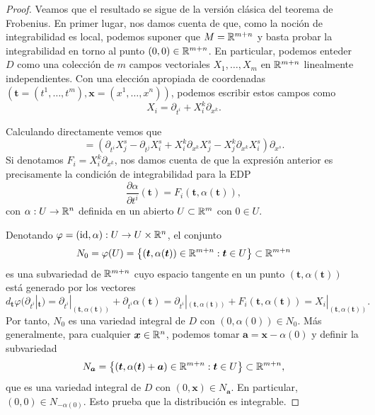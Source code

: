 \documentclass[11pt,a4paper]{amsbook}
\theoremstyle{remark} \newtheorem{rmk}[subsection]{Observación}
\theoremstyle{definition} \newtheorem{defn}[subsection]{Definición}
\theoremstyle{definition} \newtheorem{ex}[subsection]{Ejemplo}
\theoremstyle{definition} \newtheorem{ej}[subsection]{Ejercicio}
\begin{document}
\begin{proof}
  Veamos que el resultado se sigue de la versión clásica del teorema de Frobenius. En primer lugar, nos damos cuenta de que, como la noción de integrabilidad es local, podemos suponer que $M=\mathbb R^{m+n}$ y basta probar la integrabilidad en torno al punto $(0,0)\in \mathbb R^{m+n}$. En particular, podemos enteder $D$ como una colección de $m$ campos vectoriales $X_1,\dots,X_m$ en $\mathbb R^{m+n}$ linealmente independientes. Con una elección apropiada de coordenadas $(\bm{t}=(t^1,\dots,t^m),\bm{x}=(x^1,\dots,x^n))$, podemos escribir estos campos como
  \begin{equation*}
X_i = \partial_{t^i} + X_i^k \partial_{x^k}.
  \end{equation*}

  Calculando directamente vemos que
  \begin{equation*}
[X_i,X_j] = \left( \partial_{t^i} X^s_j - \partial_{t^j} X^s_i + X_i^k \partial_{x^k} X^s_j - X^k_j \partial_{x^k} X^s_i \right) \partial_{x^s}.
  \end{equation*}
  Si denotamos $F_i = X_i^k \partial_{x^k}$, nos damos cuenta de que la expresión anterior es precisamente la condición de integrabilidad para la EDP
  \begin{equation*}
\frac{\partial \alpha}{\partial t^i}(\bm{t}) = F_i(\bm{t},\alpha(\bm{t})),
  \end{equation*}
  con $\alpha:U\rightarrow \mathbb R^n$ definida en un abierto $U\subset \mathbb R^m$ con $0\in U$.

  Denotando $\varphi=(\mathrm{id},\alpha):U\rightarrow U\times \mathbb R^n$, el conjunto
  \begin{equation*}
N_0=\varphi(U) = \left\{ (\bm{t},\alpha(\bm{t})) \in \mathbb R^{m+n}: \bm{t}\in U \right\} \subset \mathbb R^{m+n}
  \end{equation*}
  es una subvariedad de $\mathbb R^{m+n}$ cuyo espacio tangente en un punto $(\bm{t},\alpha(\bm{t}))$ está generado por los vectores
  \begin{equation*}
d_{\bm{t}} \varphi (\partial_{t^i}|_{\bm{t}}) = \partial_{t^i}|_{(\bm{t},\alpha(\bm{t}))} + \partial_{t^i}\alpha (\bm{t}) = \partial_{t^i}|_{(\bm{t},\alpha(\bm{t}))} + F_i(\bm{t},\alpha(\bm{t})) = X_i|_{(\bm{t},\alpha(\bm{t}))}.
  \end{equation*}
Por tanto, $N_0$ es una variedad integral de $D$ con $(0,\alpha(0))\in N_0$. Más generalmente, para cualquier $\bm{x}\in \mathbb R^n$, podemos tomar $\bm{a}=\bm{x}-\alpha(0)$ y definir la subvariedad
  \begin{equation*}
N_{\bm{a}}= \left\{ (\bm{t},\alpha(\bm{t})+\bm{a}) \in \mathbb R^{m+n}: \bm{t}\in U \right\} \subset \mathbb R^{m+n},
  \end{equation*}
que es una variedad integral de $D$ con $(0,\bm{x})\in N_{\bm{a}}$. En particular, $(0,0)\in N_{-\alpha(0)}$. Esto prueba que la distribución es integrable.


\end{proof}
\end{document}
